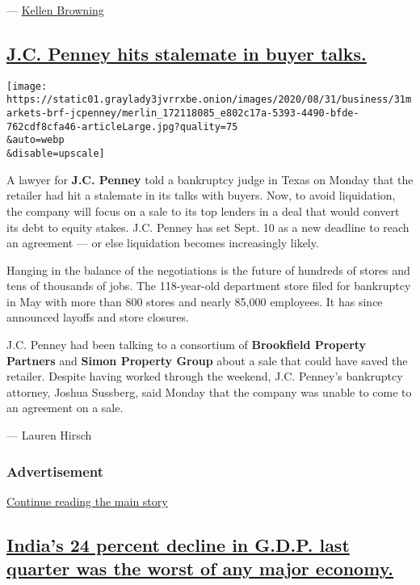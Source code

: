 --- \href{https://www.nytimes3xbfgragh.onion/by/kellen-browning}{Kellen
Browning}

\hypertarget{jc-penney-hits-stalemate-in-buyer-talks}{%
\subsection{\texorpdfstring{\protect\hyperlink{jc-penney-hits-stalemate-in-buyer-talks}{J.C.
Penney hits stalemate in buyer
talks.}}{J.C. Penney hits stalemate in buyer talks.}}\label{jc-penney-hits-stalemate-in-buyer-talks}}

\texttt{[image: https://static01.graylady3jvrrxbe.onion/images/2020/08/31/business/31markets-brf-jcpenney/merlin\_172118085\_e802c17a-5393-4490-bfde-762cdf8cfa46-articleLarge.jpg?quality=75\\\&auto=webp\\\&disable=upscale]}

A lawyer for \textbf{J.C. Penney} told a bankruptcy judge in Texas on
Monday that the retailer had hit a stalemate in its talks with buyers.
Now, to avoid liquidation, the company will focus on a sale to its top
lenders in a deal that would convert its debt to equity stakes. J.C.
Penney has set Sept. 10 as a new deadline to reach an agreement --- or
else liquidation becomes increasingly likely.

Hanging in the balance of the negotiations is the future of hundreds of
stores and tens of thousands of jobs. The 118-year-old department store
filed for bankruptcy in May with more than 800 stores and nearly 85,000
employees. It has since announced layoffs and store closures.

J.C. Penney had been talking to a consortium of \textbf{Brookfield
Property Partners} and \textbf{Simon Property Group} about a sale that
could have saved the retailer. Despite having worked through the
weekend, J.C. Penney's bankruptcy attorney, Joshua Sussberg, said Monday
that the company was unable to come to an agreement on a sale.

--- Lauren Hirsch

\hypertarget{advertisement-1}{%
\subsubsection{Advertisement}\label{advertisement-1}}

\protect\hyperlink{after-dfp-ad-mid2}{Continue reading the main story}

\hypertarget{indias-24-percent-decline-in-gdp-last-quarter-was-the-worst-of-any-major-economy}{%
\subsection{\texorpdfstring{\protect\hyperlink{indias-24-percent-decline-in-gdp-last-quarter-was-the-worst-of-any-major-economy}{India's
24 percent decline in G.D.P. last quarter was the worst of any major
economy.}}{India's 24 percent decline in G.D.P. last quarter was the worst of any major economy.}}\label{indias-24-percent-decline-in-gdp-last-quarter-was-the-worst-of-any-major-economy}}

